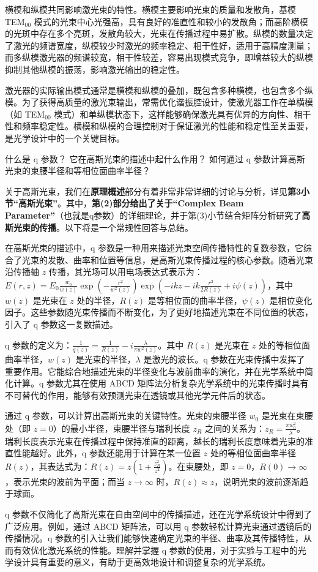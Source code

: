 横模和纵模共同影响激光束的特性。横模主要影响光束的质量和发散角，基模 TEM\(_{00}\) 模式的光束中心光强高，具有良好的准直性和较小的发散角；而高阶横模的光斑中存在多个亮斑，发散角较大，光束在传播过程中易扩散。纵模的数量决定了激光的频谱宽度，纵模较少时激光的频率稳定、相干性好，适用于高精度测量；而多纵模激光器的频谱较宽，相干性较差，容易出现模式竞争，即增益较大的纵模抑制其他纵模的振荡，影响激光输出的稳定性。

激光器的实际输出模式通常是横模和纵模的叠加，既包含多种横模，也包含多个纵模。为了获得高质量的激光束输出，常需优化谐振腔设计，使激光器工作在单横模（如 TEM\(_{00}\) 模式）和单纵模状态下，这样能够确保激光具有优异的方向性、相干性和频率稳定性。横模和纵模的合理控制对于保证激光的性能和稳定性至关重要，是光学设计中的一个关键目标。

\begin{question}
	什么是 q 参数？
	它在高斯光束的描述中起什么作用？
	如何通过 q 参数计算高斯光束的束腰半径和等相位面曲率半径？
\end{question}
关于高斯光束，我们在\textbf{原理概述}部分有着非常非常详细的讨论与分析，详见\textbf{第3小节“高斯光束”}。其中，\textbf{第(2)部分给出了关于“Complex Beam Parameter”}（也就是q参数）的详细理论，并于第(3)小节结合矩阵分析研究了\textbf{高斯光束的传播}。以下将是一个常规性回答与总结。

在高斯光束的描述中，q 参数是一种用来描述光束空间传播特性的复数参数，它综合了光束的发散、曲率和位置等信息，是高斯光束传播过程的核心参数。随着光束沿传播轴 \(z\) 传播，其光场可以用电场表达式表示为：\(E(r, z) = E_0 \frac{w_0}{w(z)} \exp\left(-\frac{r^2}{w^2(z)}\right) \exp\left(-ikz - ik\frac{r^2}{2R(z)} + i\psi(z)\right)\)，其中 \(w(z)\) 是光束在 \(z\) 处的半径，\(R(z)\) 是等相位面的曲率半径，\(\psi(z)\) 是相位变化因子。这些参数随光束传播而不断变化，为了更好地描述光束在不同位置的状态，引入了 q 参数这一复数描述。

q 参数的定义为：\(\frac{1}{q(z)} = \frac{1}{R(z)} - i\frac{\lambda}{\pi w^2(z)}\)。其中 \(R(z)\) 是光束在 \(z\) 处的等相位面曲率半径，\(w(z)\) 是光束的半径，\(\lambda\) 是激光的波长。q 参数在光束传播中发挥了重要作用。它能综合地描述光束的半径变化与波前曲率的演化，并在光学系统中简化计算。q 参数尤其在使用 ABCD 矩阵法分析复杂光学系统中的光束传播时具有不可替代的作用，能够有效预测光束在透镜或其他光学元件后的状态。

通过 q 参数，可以计算出高斯光束的关键特性。光束的束腰半径 \(w_0\) 是光束在束腰处（即 \(z = 0\)）的最小半径，束腰半径与瑞利长度 \(z_R\) 之间的关系为：\(z_R = \frac{\pi w_0^2}{\lambda}\)。瑞利长度表示光束在传播过程中保持准直的距离，越长的瑞利长度意味着光束的准直性能越好。此外，q 参数还能用于计算在某一位置 \(z\) 处的等相位面曲率半径 \(R(z)\)，其表达式为：\(R(z) = z\left(1 + \frac{z_R^2}{z^2}\right)\)。在束腰处，即 \(z = 0\)，\(R(0) \to \infty\)，表示光束的波前为平面；而当 \(z \to \infty\) 时，\(R(z) \approx z\)，说明光束的波前逐渐趋于球面。

q 参数不仅简化了高斯光束在自由空间中的传播描述，还在光学系统设计中得到了广泛应用。例如，通过 ABCD 矩阵法，可以用 q 参数轻松计算光束通过透镜后的传播情况。q 参数的引入让我们能够快速确定光束的半径、曲率及其传播特性，从而有效优化激光系统的性能。理解并掌握 q 参数的使用，对于实验与工程中的光学设计具有重要的意义，有助于更高效地设计和调整复杂的光学系统。